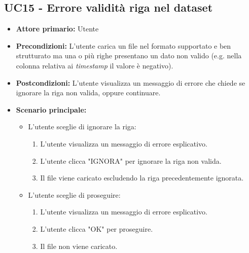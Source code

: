 \subsection{UC15 - Errore validità riga nel dataset}
\label{sec:UC15 - Errore validità riga}
\begin{itemize}
    \item \textbf{Attore primario:} Utente
    \item \textbf{Precondizioni:} L'utente carica un file nel formato supportato e ben strutturato ma una o più righe presentano un dato non valido (e.g. nella colonna relativa ai \textit{timestamp} il valore è negativo).  
    \item \textbf{Postcondizioni:} L'utente visualizza un messaggio di errore che chiede se ignorare la riga non valida, oppure continuare.
    \item \textbf{Scenario principale:}
    \begin{itemize}
        \item   L'utente sceglie di ignorare la riga:
                \begin{enumerate}
                    \item L'utente visualizza un messaggio di errore esplicativo.
                    \item L'utente clicca "IGNORA" per ignorare la riga non valida.
                    \item Il file viene caricato escludendo la riga precedentemente ignorata.
                \end{enumerate} 
        \item   L'utente sceglie di proseguire:
                \begin{enumerate}
                    \item L'utente visualizza un messaggio di errore esplicativo.
                    \item L'utente clicca "OK" per proseguire.
                    \item Il file non viene caricato.
                \end{enumerate} 
    \end{itemize}
\end{itemize}

